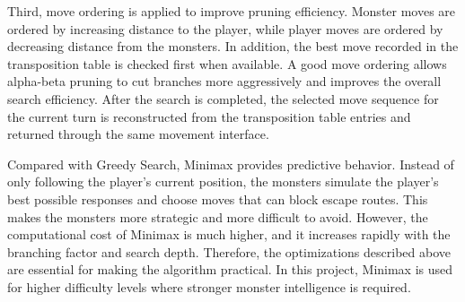 Third, move ordering is applied to improve pruning efficiency. Monster moves are 
ordered by increasing distance to the player, while player moves are ordered by 
decreasing distance from the monsters. In addition, the best move recorded in the 
transposition table is checked first when available. A good move ordering allows 
alpha-beta pruning to cut branches more aggressively and improves the overall 
search efficiency. After the search is completed, the selected move sequence for 
the current turn is reconstructed from the transposition table entries and 
returned through the same movement interface.

Compared with Greedy Search, Minimax provides predictive behavior. Instead of 
only following the player's current position, the monsters simulate the player's 
best possible responses and choose moves that can block escape routes. This makes 
the monsters more strategic and more difficult to avoid. However, the computational 
cost of Minimax is much higher, and it increases rapidly with the branching factor 
and search depth. Therefore, the optimizations described above are essential for 
making the algorithm practical. In this project, Minimax is used for higher 
difficulty levels where stronger monster intelligence is required.